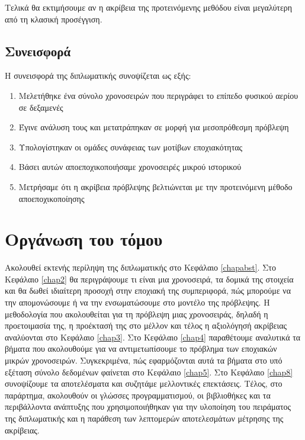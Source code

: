 Τελικά θα εκτιμήσουμε αν η ακρίβεια της προτεινόμενης μεθόδου είναι μεγαλύτερη από τη κλασική προσέγγιση.


\subsection{Συνεισφορά}

Η συνεισφορά της διπλωματικής συνοψίζεται ως εξής:

\begin{enumerate}
\item Μελετήθηκε ένα σύνολο χρονοσειρών που περιγράφει το επίπεδο φυσικού αερίου σε δεξαμενές
\item Έγινε ανάλυση τους και μετατράπηκαν σε μορφή για μεσοπρόθεσμη πρόβλεψη
\item Υπολογίστηκαν οι ομάδες συνάφειας των μοτίβων εποχιακότητας
\item Βάσει αυτών αποεποχικοποιήσαμε χρονοσειρές μικρού ιστορικού
\item Μετρήσαμε ότι η ακρίβεια πρόβλεψης βελτιώνεται με την προτεινόμενη μέθοδο αποεποχικοποίησης
\end{enumerate}


\section{Οργάνωση του τόμου}

Ακολουθεί εκτενής περίληψη της διπλωματικής στο Κεφάλαιο \ref{chapabst}. Στο Κεφάλαιο \ref{chap2} θα περιγράψουμε τι είναι μια χρονοσειρά, τα δομικά της στοιχεία και θα δωθεί ιδιαίτερη προσοχή στην εποχιακή της συμπεριφορά, πώς μπορούμε να την απομονώσουμε ή να την ενσωματώσουμε στο μοντέλο της πρόβλεψης. Η μεθοδολογία που ακολουθείται για τη πρόβλεψη μιας χρονοσειράς, δηλαδή η προετοιμασία της, η προέκτασή της στο μέλλον και τέλος η αξιολόγησή ακρίβειας αναλύονται στο Κεφάλαιο \ref{chap3}. Στο Κεφάλαιο \ref{chap4} παραθέτουμε αναλυτικά τα βήματα που ακολουθούμε για να αντιμετωπίσουμε το πρόβλημα των εποχιακών μικρών χρονοσειρών. Συγκεκριμένα, πώς εφαρμόζονται αυτά τα βήματα στο υπό εξέταση σύνολο δεδομένων φαίνεται στο Κεφάλαιο \ref{chap5}.  Στο Κεφάλαιο \ref{chap8} συνοψίζουμε τα αποτελέσματα και συζητάμε μελλοντικές επεκτάσεις.
Τέλος, στο παράρτημα, ακολουθούν οι γλώσσες προγραμματισμού, οι βιβλιοθήκες και τα περιβάλλοντα ανάπτυξης που χρησιμοποιήθηκαν για την υλοποίηση του πειράματος της διπλωματικής και η παράθεση των λεπτομερών αποτελεσμάτων μέτρησης της ακρίβειας.

